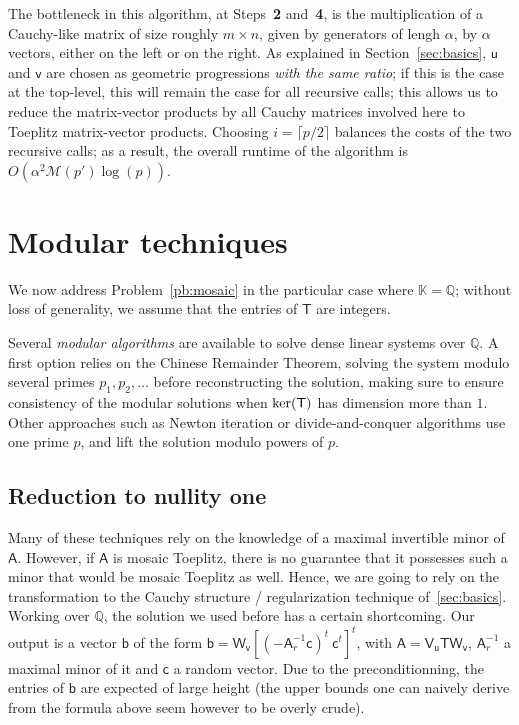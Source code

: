 \documentclass{sig-alternate}
\newcommand{\vb}{\ensuremath{\mathsf{b}}}
\newcommand{\vc}{\ensuremath{\mathsf{c}}}
\newcommand{\vu}{\ensuremath{\mathsf{u}}}
\newcommand{\vv}{\ensuremath{\mathsf{v}}}
\newcommand{\mA}{\ensuremath{\mathsf{A}}}
\newcommand{\mT}{\ensuremath{\mathsf{T}}}
\newcommand{\mV}{\ensuremath{\mathsf{V}}}
\newcommand{\mW}{\ensuremath{\mathsf{W}}}
\newcommand{\K}{\ensuremath{\mathbb{K}}}
\newcommand{\Q}{\ensuremath{\mathbb{Q}}}
\newcommand{\M}{\ensuremath{\mathscr{M}}}
\begin{document}
\medskip

The bottleneck in this algorithm, at Steps~{\bf 2} and~{\bf 4}, is the
multiplication of a Cauchy-like matrix of size roughly $m \times n$,
given by generators of lengh $\alpha$, by $\alpha$ vectors, either on
the left or on the right. As explained in Section~\ref{sec:basics},
$\vu$ and $\vv$ are chosen as geometric progressions {\em with the
  same ratio}; if this is the case at the top-level, this will remain
the case for all recursive calls; this allows us to reduce the
matrix-vector products by all Cauchy matrices involved here to
Toeplitz matrix-vector products. Choosing $i=\lceil p/2\rceil$
balances the costs of the two recursive calls; as a result, the
overall runtime of the algorithm is $O(\alpha^2 \M(p') \log(p))$.


\section{Modular techniques}\label{sec:lifting}

We now address Problem~\ref{pb:mosaic} in the particular case where
$\K=\Q$; without loss of generality, we assume that the entries of
$\mT$ are integers.

Several {\em modular algorithms} are available to solve dense linear
systems over $\Q$. A first option relies on the Chinese Remainder
Theorem, solving the system modulo several primes $p_1,p_2,\dots$
before reconstructing the solution, making sure to ensure consistency
of the modular solutions when ${\rm ker}(\mT)$ has dimension more than
$1$. Other approaches such as Newton iteration or divide-and-conquer
algorithms use one prime $p$, and lift the solution modulo powers of $p$.


\subsection{Reduction to nullity one}

Many of these techniques rely on the knowledge of a maximal invertible
minor of $\mA$. However, if $\mA$ is mosaic Toeplitz, there is no
guarantee that it possesses such a minor that would be mosaic Toeplitz
as well. Hence, we are going to rely on the transformation to the
Cauchy structure / regularization technique of~\ref{sec:basics}.
Working over $\Q$, the solution we used before has a certain
shortcoming. Our output is a vector $\vb$ of the form
$\vb=\mW_{\vv}[(-\mA_r^{-1}\vc)^t ~ \vc^t]^t$, with $\mA=\mV_\vu \mT
\mW_{\vv}$, $\mA_r^{-1}$ a maximal minor of it and $\vc$ a random
vector. Due to the preconditionning, the entries of $\vb$ are expected
of large height (the upper bounds one can naively derive from the
formula above seem however to be overly crude).
\end{document}
